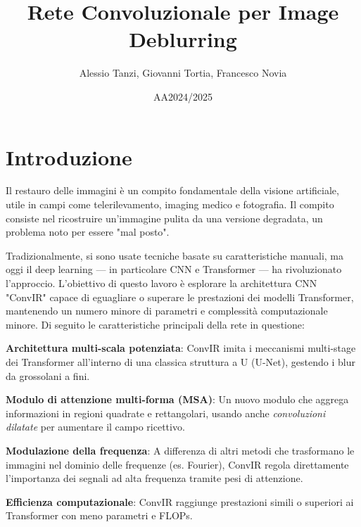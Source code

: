 \documentclass[a4paper,10pt,twocolumn]{article}
\title{\textbf{Rete Convoluzionale per Image Deblurring}}
\author{Alessio Tanzi, Giovanni Tortia, Francesco Novia}
\date{AA2024/2025}
\begin{document}

\section{Introduzione}

Il restauro delle immagini è un compito fondamentale della visione artificiale, utile in campi come telerilevamento,
imaging medico e fotografia. Il compito consiste nel ricostruire un'immagine pulita da una versione degradata,
un problema noto per essere "mal posto".

Tradizionalmente, si sono usate tecniche basate su caratteristiche manuali, ma oggi il deep learning — in particolare CNN e Transformer —
ha rivoluzionato l'approccio.
L'obiettivo di questo lavoro è esplorare la architettura CNN "ConvIR"\cite{convir} capace di eguagliare o superare le prestazioni dei
modelli Transformer, mantenendo un numero minore di parametri e complessit\`a computazionale minore.
Di seguito le caratteristiche principali della rete in questione:

\textbf{Architettura multi-scala potenziata}: \mbox{ConvIR} imita i meccanismi multi-stage dei Transformer all'interno di una classica struttura a U (U-Net),
gestendo i blur da grossolani a fini.

\textbf{Modulo di attenzione multi-forma (MSA)}: Un nuovo modulo che aggrega informazioni in regioni quadrate e rettangolari,
usando anche \textit{convoluzioni dilatate} per aumentare il campo ricettivo.

\textbf{Modulazione della frequenza}: A differenza di altri metodi che trasformano le immagini nel dominio delle frequenze (es. Fourier),
ConvIR regola direttamente l'importanza dei segnali ad alta frequenza tramite pesi di attenzione.

\textbf{Efficienza computazionale}: ConvIR raggiunge prestazioni simili o superiori ai Transformer con meno parametri e FLOPs.
\end{document}
